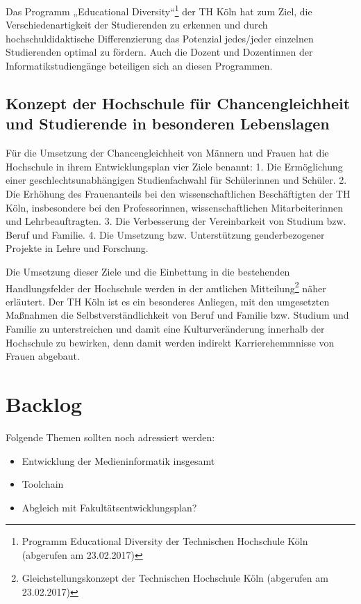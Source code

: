 Das Programm „Educational Diversity``\footnote{Programm Educational
  Diversity der Technischen Hochschule Köln (abgerufen am 23.02.2017)}
der TH Köln hat zum Ziel, die Verschiedenartigkeit der Studierenden zu
erkennen und durch hochschuldidaktische Differenzierung das Potenzial
jedes/jeder einzelnen Studierenden optimal zu fördern. Auch die Dozent
und Dozentinnen der Informatikstudiengänge beteiligen sich an diesen
Programmen.

\section{Konzept der Hochschule für Chancengleichheit und Studierende
in besonderen
Lebenslagen}\label{konzept-der-hochschule-fuxfcr-chancengleichheit-und-studierende-in-besonderen-lebenslagen}

Für die Umsetzung der Chancengleichheit von Männern und Frauen hat die
Hochschule in ihrem Entwicklungsplan vier Ziele benannt: 1. Die
Ermöglichung einer geschlechtsunabhängigen Studienfachwahl für
Schülerinnen und Schüler. 2. Die Erhöhung des Frauenanteils bei den
wissenschaftlichen Beschäftigten der TH Köln, insbesondere bei den
Professorinnen, wissenschaftlichen Mitarbeiterinnen und
Lehrbeauftragten. 3. Die Verbesserung der Vereinbarkeit von Studium bzw.
Beruf und Familie. 4. Die Umsetzung bzw. Unterstützung genderbezogener
Projekte in Lehre und Forschung.

Die Umsetzung dieser Ziele und die Einbettung in die bestehenden
Handlungsfelder der Hochschule werden in der amtlichen
Mitteilung\footnote{Gleichstellungskonzept der Technischen Hochschule
  Köln (abgerufen am 23.02.2017)} näher erläutert. Der TH Köln ist es
ein besonderes Anliegen, mit den umgesetzten Maßnahmen die
Selbstverständlichkeit von Beruf und Familie bzw. Studium und Familie zu
unterstreichen und damit eine Kulturveränderung innerhalb der Hochschule
zu bewirken, denn damit werden indirekt Karrierehemmnisse von Frauen
abgebaut.

\chapter{Backlog}\label{backlog}

Folgende Themen sollten noch adressiert werden:

\begin{itemize}
\tightlist
\item
  Entwicklung der Medieninformatik insgesamt
\item
  Toolchain
\item
  Abgleich mit Fakultätsentwicklungsplan?
\end{itemize}


